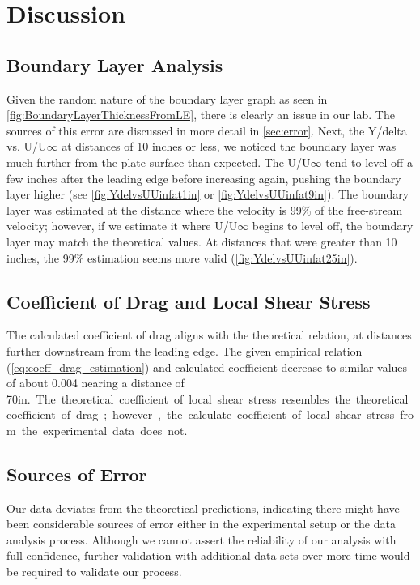 \chapter{Discussion}
\label{cp:discussion}
\section{Boundary Layer Analysis}

Given the random nature of the boundary layer graph as seen in \autoref{fig:BoundaryLayerThicknessFromLE}, there is clearly an issue in our lab. The sources of this error are discussed in more detail in \autoref{sec:error}. Next, the Y/delta vs. U/U$\infty$ at distances of 10 inches or less, we noticed the boundary layer was much further from the plate surface than expected. The U/U$\infty$ tend to level off a few inches after the leading edge before increasing again, pushing the boundary layer higher (see \autoref{fig:YdelvsUUinfat1in} or \autoref{fig:YdelvsUUinfat9in}). The boundary layer was estimated at the distance where the velocity is 99\% of the free-stream velocity; however, if we estimate it where U/U$\infty$ begins to level off, the boundary layer may match the theoretical values. At distances that were greater than 10 inches, the 99\% estimation seems more valid (\autoref{fig:YdelvsUUinfat25in}). 

\section{Coefficient of Drag and Local Shear Stress}
The calculated coefficient of drag aligns with the theoretical relation, at distances further downstream from the leading edge. The given empirical relation (\autoref{eq:coeff_drag_estimation}) and calculated coefficient decrease to similar values of about \num{0.004} nearing a distance of \num{70}\unit{in.}. The theoretical coefficient of local shear stress resembles the theoretical coefficient of drag; however, the calculate coefficient of local shear stress from the experimental data does not. 

\section{Sources of Error} \label{sec:error}

Our data deviates from the theoretical predictions, indicating there might have been considerable sources of error either in the experimental setup or the data analysis process. Although we cannot assert the reliability of our analysis with full confidence, further validation with additional data sets over more time would be required to validate our process.

